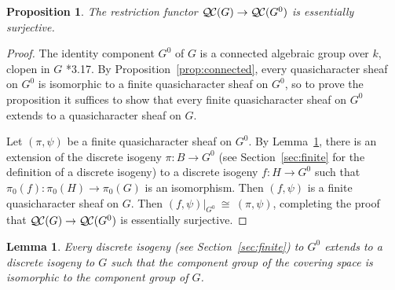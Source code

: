 \documentclass[11pt]{amsart}
\theoremstyle{plain}
\newtheorem{proposition}[theorem]{Proposition}
\newtheorem{lemma}[theorem]{Lemma}
\theoremstyle{definition}
\theoremstyle{remark}
\newcommand{\Fq}{k}
\newcommand{\iso}{{\ \cong\ }}
\newcommand{\QC}{{\mathcal{Q\hskip-0.8pt C}}}
\begin{document}
\begin{proposition}\label{prop:restriction}
  The restriction functor $\QC(G)\to \QC(G^0)$ is essentially surjective.
\end{proposition}

\begin{proof}
  The identity component $G^0$ of $G$ is a connected algebraic group over $\Fq$, 
  clopen in $G$ \cite{vdGeer-Moonen:AbelianVarieties}*{3.17}. 
  By Proposition~\ref{prop:connected}, every
  quasicharacter sheaf on $G^0$ is isomorphic to a 
  finite quasicharacter sheaf on $G^0$, 
  so to prove the proposition it suffices to show that every 
  finite quasicharacter sheaf on $G^0$ extends to a quasicharacter sheaf on $G$.
  
 Let $(\pi,\psi)$ be a finite quasicharacter sheaf on $G^0$.
 By Lemma~\ref{lemma:ext}, there is an extension of the 
 discrete isogeny $\pi : B \to G^0$ 
 (see Section~\ref{sec:finite} for the definition of a discrete isogeny) 
 to a discrete isogeny $f : H \to G^0$ 
 such that $\pi_0(f) : \pi_0(H)\to \pi_0(G)$ is an isomorphism.
 Then $(f,\psi)$ is a finite quasicharacter sheaf on $G$.
 Then $(f,\psi)\vert_{G^0} \iso (\pi,\psi)$,
 completing the proof that $\QC(G)\to \QC(G^0)$ is essentially surjective.
\end{proof}

\begin{lemma}\label{lemma:ext}
Every discrete isogeny (see Section~\ref{sec:finite}) to $G^0$ extends to a discrete
isogeny to $G$ such that the component group of the covering space is isomorphic
to the component group of $G$.
\end{lemma}
\end{document}
